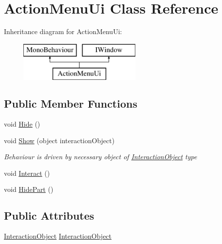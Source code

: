 \hypertarget{class_action_menu_ui}{}\section{Action\+Menu\+Ui Class Reference}
\label{class_action_menu_ui}
Inheritance diagram for Action\+Menu\+Ui\+:\begin{figure}[H]
\begin{center}
\leavevmode
\includegraphics[height=2.000000cm]{class_action_menu_ui}
\end{center}
\end{figure}
\subsection*{Public Member Functions}
\begin{DoxyCompactItemize}
\item 
void \mbox{\hyperlink{class_action_menu_ui_a205cb239d9c7677519de0bab93018659}{Hide}} ()
\item 
void \mbox{\hyperlink{class_action_menu_ui_a8eb85d66f1eb4b4531400dfca9a3b19a}{Show}} (object interaction\+Object)
\begin{DoxyCompactList}\small\item\em Behaviour is driven by necessary object of \mbox{\hyperlink{class_interaction_object}{Interaction\+Object}} type \end{DoxyCompactList}\item 
void \mbox{\hyperlink{class_action_menu_ui_af5a4e0171f5fcdc35a2464eeb1854a85}{Interact}} ()
\item 
void \mbox{\hyperlink{class_action_menu_ui_a3656f512a20980a20263283712bac01d}{Hide\+Part}} ()
\end{DoxyCompactItemize}
\subsection*{Public Attributes}
\begin{DoxyCompactItemize}
\item 
\mbox{\hyperlink{class_interaction_object}{Interaction\+Object}} \mbox{\hyperlink{class_action_menu_ui_a125b419d9b19f37c0e57bf574b3b5431}{Interaction\+Object}}
\end{DoxyCompactItemize}


